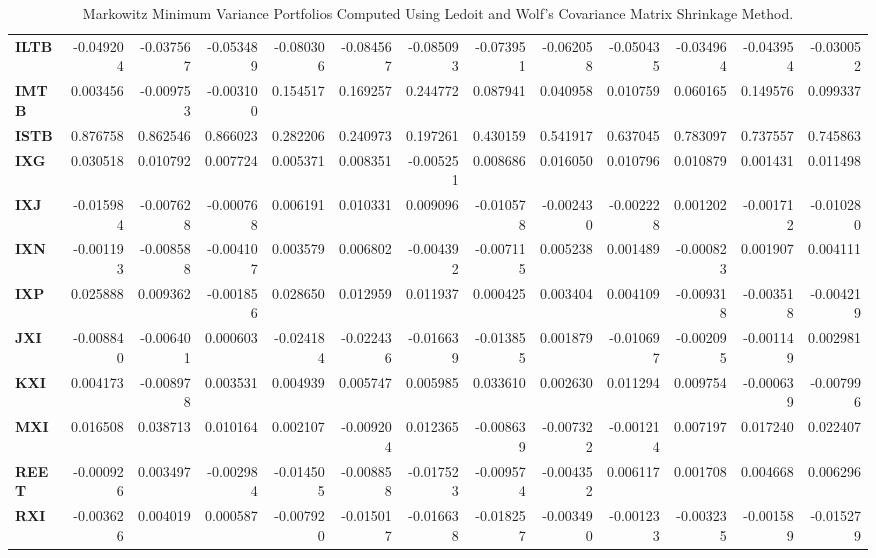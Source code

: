 \begin{table}[h!]
{\begin{tabular}{lrrrrrrrrrrrr}
        \textbf{ILTB} & -0.049204 & -0.037567 & -0.053489 & -0.080306 & -0.084567 & -0.085093 & -0.073951 & -0.062058 & -0.050435 & -0.034964 & -0.043954 & -0.030052 \\
        \textbf{IMTB} & 0.003456  & -0.009753 & -0.003100 & 0.154517  & 0.169257  & 0.244772  & 0.087941  & 0.040958  & 0.010759  & 0.060165  & 0.149576  & 0.099337  \\
        \textbf{ISTB} & 0.876758  & 0.862546  & 0.866023  & 0.282206  & 0.240973  & 0.197261  & 0.430159  & 0.541917  & 0.637045  & 0.783097  & 0.737557  & 0.745863  \\
        \textbf{IXG}  & 0.030518  & 0.010792  & 0.007724  & 0.005371  & 0.008351  & -0.005251 & 0.008686  & 0.016050  & 0.010796  & 0.010879  & 0.001431  & 0.011498  \\
        \textbf{IXJ}  & -0.015984 & -0.007628 & -0.000768 & 0.006191  & 0.010331  & 0.009096  & -0.010578 & -0.002430 & -0.002228 & 0.001202  & -0.001712 & -0.010280 \\
        \textbf{IXN}  & -0.001193 & -0.008588 & -0.004107 & 0.003579  & 0.006802  & -0.004392 & -0.007115 & 0.005238  & 0.001489  & -0.000823 & 0.001907  & 0.004111  \\
        \textbf{IXP}  & 0.025888  & 0.009362  & -0.001856 & 0.028650  & 0.012959  & 0.011937  & 0.000425  & 0.003404  & 0.004109  & -0.009318 & -0.003518 & -0.004219 \\
        \textbf{JXI}  & -0.008840 & -0.006401 & 0.000603  & -0.024184 & -0.022436 & -0.016639 & -0.013855 & 0.001879  & -0.010697 & -0.002095 & -0.001149 & 0.002981  \\
        \textbf{KXI}  & 0.004173  & -0.008978 & 0.003531  & 0.004939  & 0.005747  & 0.005985  & 0.033610  & 0.002630  & 0.011294  & 0.009754  & -0.000639 & -0.007996 \\
        \textbf{MXI}  & 0.016508  & 0.038713  & 0.010164  & 0.002107  & -0.009204 & 0.012365  & -0.008639 & -0.007322 & -0.001214 & 0.007197  & 0.017240  & 0.022407  \\
        \textbf{REET} & -0.000926 & 0.003497  & -0.002984 & -0.014505 & -0.008858 & -0.017523 & -0.009574 & -0.004352 & 0.006117  & 0.001708  & 0.004668  & 0.006296  \\
        \textbf{RXI}  & -0.003626 & 0.004019  & 0.000587  & -0.007920 & -0.015017 & -0.016638 & -0.018257 & -0.003490 & -0.001233 & -0.003235 & -0.001589 & -0.015279
    \end{tabular}}
    \caption{Markowitz Minimum Variance Portfolios Computed Using Ledoit and Wolf's Covariance Matrix Shrinkage Method.}
\end{table}


